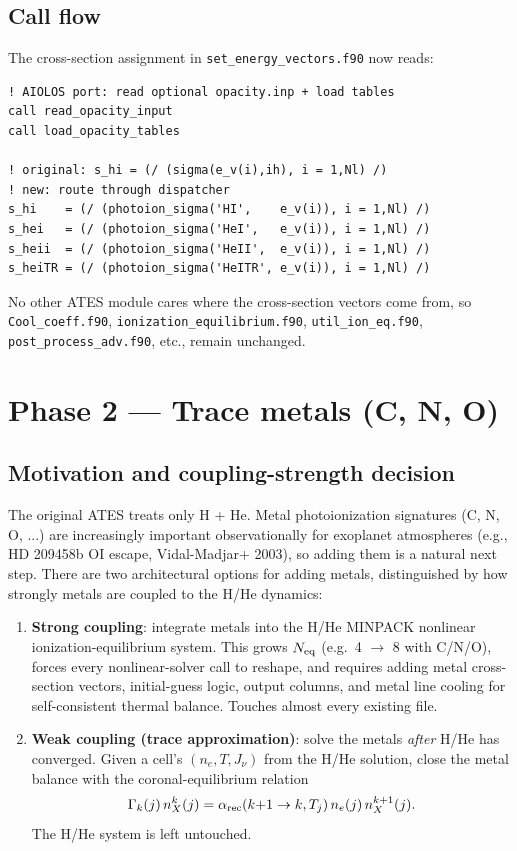 \documentclass[english,a4paper]{my_memo}
\begin{document}
\subsection{Call flow}

The cross-section assignment in \texttt{set\_energy\_vectors.f90} now reads:

\begin{verbatim}
! AIOLOS port: read optional opacity.inp + load tables
call read_opacity_input
call load_opacity_tables

! original: s_hi = (/ (sigma(e_v(i),ih), i = 1,Nl) /)
! new: route through dispatcher
s_hi    = (/ (photoion_sigma('HI',    e_v(i)), i = 1,Nl) /)
s_hei   = (/ (photoion_sigma('HeI',   e_v(i)), i = 1,Nl) /)
s_heii  = (/ (photoion_sigma('HeII',  e_v(i)), i = 1,Nl) /)
s_heiTR = (/ (photoion_sigma('HeITR', e_v(i)), i = 1,Nl) /)
\end{verbatim}

No other ATES module cares where the cross-section vectors come from, so
\texttt{Cool\_coeff.f90}, \texttt{ionization\_equilibrium.f90},
\texttt{util\_ion\_eq.f90}, \texttt{post\_process\_adv.f90}, etc., remain
unchanged.

\section{Phase 2 --- Trace metals (C, N, O)}

\subsection{Motivation and coupling-strength decision}

The original ATES treats only H + He. Metal photoionization signatures
(C, N, O, ...) are increasingly important observationally for exoplanet
atmospheres (e.g., HD 209458b OI escape, Vidal-Madjar+ 2003), so adding them
is a natural next step. There are two architectural options for adding
metals, distinguished by how strongly metals are coupled to the H/He
dynamics:

\begin{enumerate}
\item \textbf{Strong coupling}: integrate metals into the H/He MINPACK
nonlinear ionization-equilibrium system. This grows $N_{\rm eq}$ (e.g.\
4 $\to$ 8 with C/N/O), forces every nonlinear-solver call to reshape, and
requires adding metal cross-section vectors, initial-guess logic, output
columns, and metal line cooling for self-consistent thermal balance.
Touches almost every existing file.

\item \textbf{Weak coupling (trace approximation)}: solve the metals
\emph{after} H/He has converged. Given a cell's $(n_e, T, J_\nu)$ from the
H/He solution, close the metal balance with the coronal-equilibrium
relation
\[
\Gamma_k(j)\,n_X^k(j)
   = \alpha_{\rm rec}(k{+}1 \to k, T_j)\,n_e(j)\,n_X^{k+1}(j).
\]
The H/He system is left untouched.
\end{enumerate}
\end{document}

